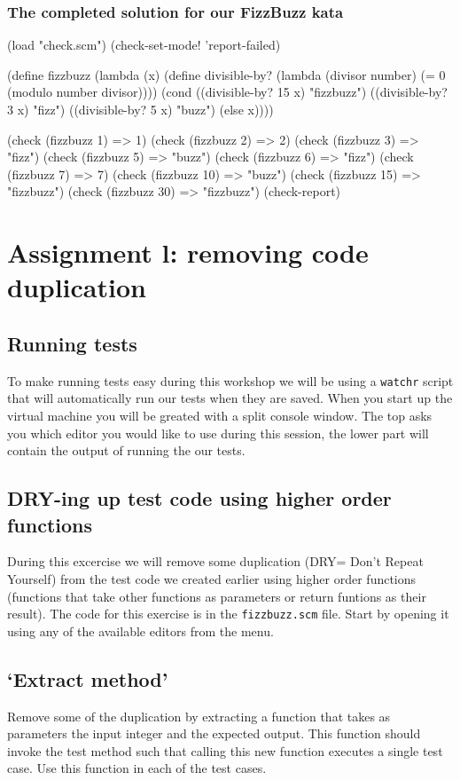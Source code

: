 \documentclass[12pt,a4paper,english,twoside]{article}
\begin{document}
\subsubsection{The completed solution for our FizzBuzz kata}
\begin{schemecode}
(load "check.scm")
(check-set-mode! 'report-failed)

(define fizzbuzz 
  (lambda (x) 
    (define divisible-by?  
      (lambda (divisor number)
        (= 0 (modulo number divisor))))
    (cond ((divisible-by? 15 x) "fizzbuzz")
        ((divisible-by? 3 x) "fizz")
        ((divisible-by? 5 x) "buzz")
          (else x))))

(check (fizzbuzz 1) => 1)
(check (fizzbuzz 2) => 2)
(check (fizzbuzz 3) => "fizz")
(check (fizzbuzz 5) => "buzz")
(check (fizzbuzz 6) => "fizz")
(check (fizzbuzz 7) => 7)
(check (fizzbuzz 10) => "buzz")
(check (fizzbuzz 15) => "fizzbuzz")
(check (fizzbuzz 30) => "fizzbuzz")
(check-report)
\end{schemecode}
\section{Assignment l: removing code duplication}
\subsection{Running tests}
To make running tests easy during this workshop we will be using a 
\texttt{watchr} script that will automatically run our tests when they are 
saved. When you start up the virtual machine you will be greated with a split 
console window. The top asks you which editor you would like to use during 
this session, the lower part will contain the output of running the our tests.
\subsection{DRY-ing up test code using higher order functions}
During this excercise we will remove some duplication (DRY= Don't Repeat 
Yourself) from the test code we created earlier using higher order functions 
(functions that take other functions as parameters or return funtions as their 
result). The code for this exercise is in the \texttt{fizzbuzz.scm} file.  
Start by opening it using any of the available editors from the menu.  
\subsection{`Extract method'}
Remove some of the duplication by extracting a function that takes as 
parameters the input integer and the expected output. This function should 
invoke the test method such that calling this new function executes a single 
test case. Use this function in each of the test cases.
\end{document}

